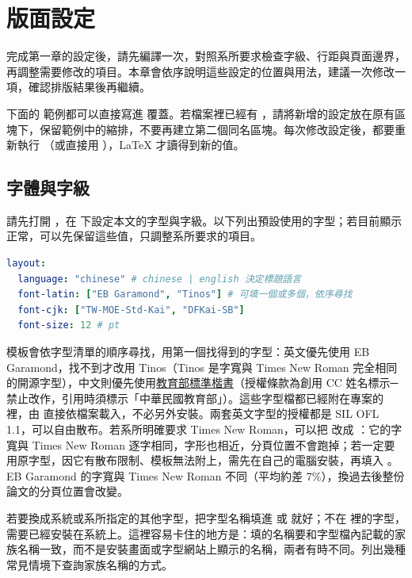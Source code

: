 \chapter{版面設定}\label{cha:layout}

完成第一章的設定後，請先編譯一次，對照系所要求檢查字級、行距與頁面邊界，再調整需要修改的項目。本章會依序說明這些設定的位置與用法，建議一次修改一項，確認排版結果後再繼續。

下面的  範例都可以直接寫進  覆蓋。若檔案裡已經有 ，請將新增的設定放在原有區塊下，保留範例中的縮排，不要再建立第二個同名區塊。每次修改設定後，都要重新執行 （或直接用 ），\LaTeX{} 才讀得到新的值。

\section{字體與字級}

請先打開 ，在  下設定本文的字型與字級。以下列出預設使用的字型；若目前顯示正常，可以先保留這些值，只調整系所要求的項目。

\begin{lstlisting}[language=yaml]
layout:
  language: "chinese" # chinese | english 決定標題語言
  font-latin: ["EB Garamond", "Tinos"] # 可填一個或多個，依序尋找
  font-cjk: ["TW-MOE-Std-Kai", "DFKai-SB"]
  font-size: 12 # pt
\end{lstlisting}

模板會依字型清單的順序尋找，用第一個找得到的字型：英文優先使用 EB Garamond，找不到才改用 Tinos（Tinos 是字寬與 Times New Roman 完全相同的開源字型），中文則優先使用\href{https://language.moe.gov.tw/material/info?m=9fe3fe82-8bbf-44c0-961d-873ea079e284}{教育部標準楷書}（授權條款為創用 CC 姓名標示─禁止改作，引用時須標示「中華民國教育部」）。這些字型檔都已經附在專案的  裡，由  直接依檔案載入，不必另外安裝。兩套英文字型的授權都是 SIL OFL 1.1，可以自由散布。若系所明確要求 Times New Roman，可以把  改成 ：它的字寬與 Times New Roman 逐字相同，字形也相近，分頁位置不會跑掉；若一定要用原字型，因它有散布限制、模板無法附上，需先在自己的電腦安裝，再填入 。EB Garamond 的字寬與 Times New Roman 不同（平均約差 7\%），換過去後整份論文的分頁位置會改變。

若要換成系統或系所指定的其他字型，把字型名稱填進  或  就好；不在  裡的字型，需要已經安裝在系統上。這裡容易卡住的地方是：填的名稱要和字型檔內記載的家族名稱一致，而不是安裝畫面或字型網站上顯示的名稱，兩者有時不同。列出幾種常見情境下查詢家族名稱的方式。

